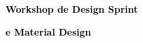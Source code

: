 \documentclass{article}
\begin{document}
	\color{textGray}
	\vspace*{105pt} %
	\Huge
	\BgThispage
		\textcolor{black}{\textbf{Workshop de Design Sprint}}

		\textcolor{black}{\textbf{e Material Design}}
	\BgThispage
	\vspace*{20pt}

	

	

	

	

	
\end{document}
